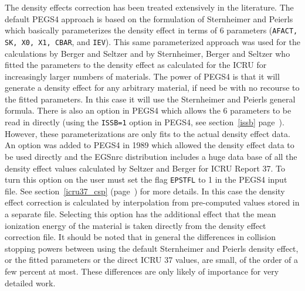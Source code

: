 The density effects correction 
has been treated extensively in the literature. 
The default PEGS4 approach is based on the formulation of Sternheimer and
Peierls\cite{SP71} which basically parameterizes the density effect in
terms of 6 parameters ({\tt AFACT, SK, X0, X1, CBAR}, and {\tt IEV}).  This same parameterized approach was used for
the calculations by Berger and Seltzer \cite{BS83} and by 
Sternheimer, Berger and  Seltzer \cite{St82} who fitted the parameters to
the density effect as calculated for the ICRU for increasingly larger
numbers of materials.  The power of PEGS4 is that it will generate a
density effect for any arbitrary material, if need be with no recourse to the fitted
parameters. In this case it will use the  Sternheimer and 
Peierls\cite{SP71} general formula.  There is also an option in PEGS4 which allows the 6
parameters to be read in directly (using the {\tt ISSB=1} option in PEGS4,
see section~\ref{issb} page~\pageref{issb}). However, these
parameterizations are only fits to the actual density effect data. An
option was added to PEGS4 in 1989 which allowed the density effect data
to be used directly\cite{Du89} and the EGSnrc distribution includes a huge
data base of all the density effect values calculated by Seltzer and Berger
for ICRU Report 37\cite{ICRU37}.  
To turn this option on the user must 
set the flag {\tt EPSTFL} to 1 in the PEGS4 input file. See
section~\ref{icru37_csp} (page~\pageref{icru37_csp}) for more details.
In this case the density effect correction is calculated 
by interpolation from pre-computed values stored in 
a separate file.  
Selecting this option has the additional effect that the mean 
ionization energy of the material is taken directly from 
the density effect correction file. It should be noted that in general the
differences in collision stopping powers between using the default Sternheimer
and Peierls density effect, or the fitted parameters or the direct ICRU 37
values, are small, of the order of a few percent at most.  These
differences are only
likely of importance for very detailed work.

